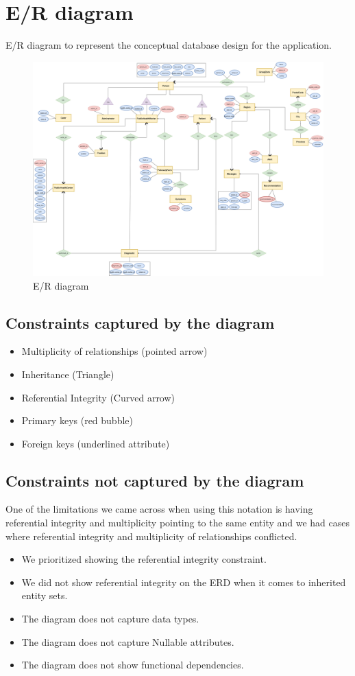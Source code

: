 \section{E/R diagram}
E/R diagram to represent the conceptual database design for the application.

\begin{figure}[H]
    \centering
    \includegraphics[scale=0.22]{imgs/ERD.PNG}
    \caption{E/R diagram}
\end{figure}

\subsection{Constraints captured by the diagram}
\begin{itemize}
    \item Multiplicity of relationships (pointed arrow)
    \item Inheritance (Triangle)
    \item Referential Integrity (Curved arrow)
    \item Primary keys (red bubble)
    \item Foreign keys (underlined attribute)
\end{itemize}
\subsection{Constraints not captured by the diagram}
One of the limitations we came across when using this notation is having referential integrity and multiplicity pointing to the same entity and we had cases where referential integrity and multiplicity of relationships conflicted.
\begin{itemize}
    \item We prioritized showing the referential integrity constraint. 
    \item We did not show referential integrity on the ERD when it comes to inherited entity sets.
    \item The diagram does not capture data types.
    \item The diagram does not capture Nullable attributes.
    \item The diagram does not show functional dependencies.
\end{itemize} 
